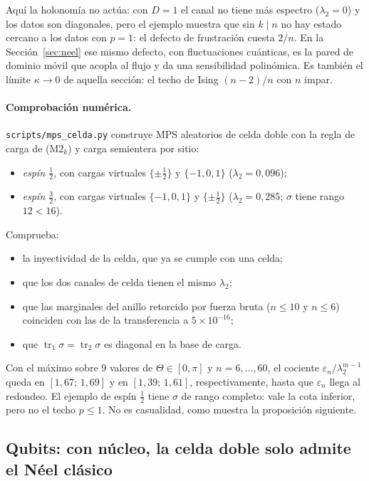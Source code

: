 \documentclass[11pt,a4paper]{article}
\theoremstyle{remark}
\newcommand{\tr}{\operatorname{tr}}
\begin{document}
Aquí la holonomía no actúa: con $D=1$ el canal no tiene más espectro ($\lambda_2=0$) y los
datos son diagonales, pero el ejemplo muestra que sin
$k\mid n$ no hay estado cercano a los datos con $p=1$: el defecto de frustración cuesta $2/n$. En
la Sección~\ref{sec:neel} ese mismo defecto, con fluctuaciones cuánticas, es la pared de dominio
móvil que acopla al flujo y da una sensibilidad polinómica. Es también el límite $\kappa\to0$ de aquella sección: el
techo de Ising $(n-2)/n$ con $n$ impar.

\paragraph{Comprobación numérica.} \texttt{scripts/mps\_celda.py} construye MPS aleatorios de
celda doble con la regla de carga de (M2$_k$) y carga semientera por sitio:
\begin{itemize}
\item \emph{espín $\tfrac12$}, con cargas virtuales $\{\pm\tfrac12\}$ y $\{-1,0,1\}$
  ($\lambda_2=0{,}096$);
\item \emph{espín $\tfrac32$}, con cargas virtuales $\{-1,0,1\}$ y $\{\pm\tfrac12\}$
  ($\lambda_2=0{,}285$; $\sigma$ tiene rango $12<16$).
\end{itemize}
Comprueba:
\begin{itemize}
\item la inyectividad de la celda, que ya se cumple con una celda;
\item que los dos canales de celda tienen el mismo $\lambda_2$;
\item que las marginales del anillo retorcido por fuerza bruta ($n\le10$ y $n\le6$) coinciden con
  las de la transferencia a $5\times10^{-16}$;
\item que $\tr_1\sigma=\tr_2\sigma$ es diagonal en la base de carga.
\end{itemize}
Con el máximo sobre $9$ valores de $\Theta\in[0,\pi]$ y $n=6,\dots,60$, el cociente
$\varepsilon_n/\lambda_2^{m-1}$ queda en $[1{,}67;\,1{,}69]$ y en $[1{,}39;\,1{,}61]$,
respectivamente, hasta que $\varepsilon_n$ llega al redondeo. El ejemplo de espín $\tfrac12$ tiene
$\sigma$ de rango completo: vale la cota inferior, pero no el techo $p\le1$. No es casualidad,
como muestra la proposición siguiente.

\subsection*{Qubits: con núcleo, la celda doble solo admite el Néel clásico}
\end{document}
